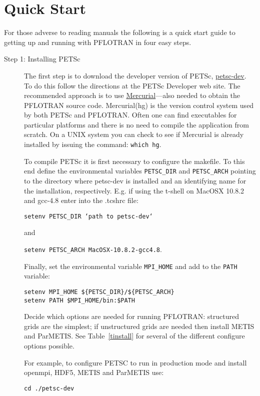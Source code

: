 \section{Quick Start}

For those adverse to reading manuals the following is a quick start guide to getting up and running with PFLOTRAN in four easy steps.

\begin{description}
\item[Step 1: Installing PETSc] The first step is to download the developer version of PETSc, \href{http://www.mcs.anl.gov/petsc/developers/index.html}{petsc-dev}. To do this follow the directions at the PETSc Developer web site. The recommended approach is to use \href{http://mercurial.selenic.com/}{Mercurial}---also needed to obtain the PFLOTRAN source code. Mercurial(hg) is the version control system used by both PETSc and PFLOTRAN. Often one can find executables for particular platforms and there is no need to compile the application from scratch. On a UNIX system you can check to see if Mercurial is already installed by issuing the command: {\footnotesize\tt which hg}.

To compile PETSc it is first necessary to configure the makefile. To this end define the environmental variables {\footnotesize\tt PETSC\_DIR} and {\footnotesize\tt PETSC\_ARCH} pointing to the directory where petsc-dev is installed and an identifying name for the installation, respectively. E.g. if using the t-shell on MacOSX 10.8.2 and gcc-4.8 enter into the .tcshrc file:

{\footnotesize\tt setenv PETSC\_DIR `path to petsc-dev`}

and

{\footnotesize\tt setenv PETSC\_ARCH MacOSX-10.8.2-gcc4.8}.

Finally, set the environmental variable {\footnotesize\tt MPI\_HOME} and add to the {\footnotesize\tt PATH} variable:
\footnotesize
\begin{Verbatim}
setenv MPI_HOME ${PETSC_DIR}/${PETSC_ARCH}
setenv PATH $MPI_HOME/bin:$PATH
\end{Verbatim}
\normalsize
Decide which options are needed for running PFLOTRAN: structured grids are the simplest; if unstructured grids are needed then install METIS and ParMETIS. See Table~\ref{tinstall} for several of the different configure options possible.

For example, to configure PETSC to run in production mode and install openmpi, HDF5, METIS and ParMETIS use:
\footnotesize
\begin{Verbatim}
cd ./petsc-dev


\end{Verbatim}
\end{description}
